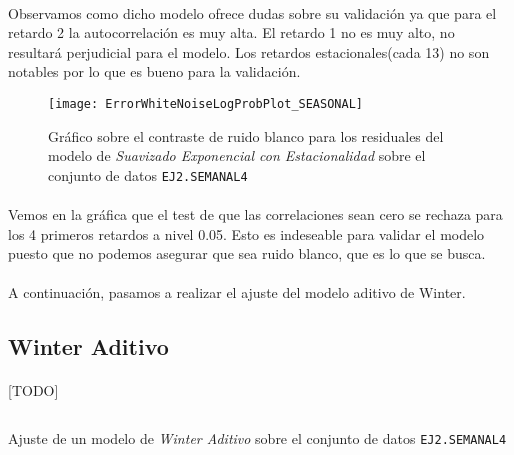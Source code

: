 \documentclass[a4paper, spanish]{article}
\begin{document}
      \paragraph{}
      Observamos como dicho modelo ofrece dudas sobre su validación ya que para el retardo 2 la autocorrelación es muy alta. El retardo 1 no es muy alto, no resultará perjudicial para el modelo. Los retardos estacionales(cada 13) no son notables por lo que es bueno para la validación.

      \begin{figure}[htb!]
        \centering
        \texttt{[image: ErrorWhiteNoiseLogProbPlot\_SEASONAL]}
        \caption{Gráfico sobre el contraste de ruido blanco para los residuales del modelo de \emph{Suavizado Exponencial con Estacionalidad} sobre el conjunto de datos \texttt{EJ2.SEMANAL4}}
        \label{img:b_seasonal_test_white_noise}
      \end{figure}

      \paragraph{}
      Vemos en la gráfica que el test de que las correlaciones sean cero se rechaza para los 4 primeros retardos a nivel 0.05. Esto es indeseable para validar el modelo puesto que no podemos asegurar que sea ruido blanco, que es lo que se busca.

      \paragraph{}
      A continuación, pasamos a realizar el ajuste del modelo aditivo de Winter.

    \subsection{Winter Aditivo}

      \paragraph{}
      [TODO]

      \begin{listing}[htb!]
        \centering
        \inputminted{SAS}{./res/code/b-01-esm-winteradd.sas}
        \caption{Ajuste de un modelo de \emph{Winter Aditivo} sobre el conjunto de datos \texttt{EJ2.SEMANAL4}}
        \label{code:b_winter_additive_esm}
      \end{listing}
\end{document}
